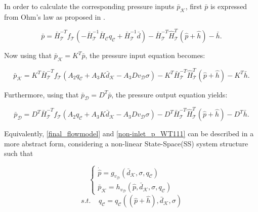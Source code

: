 In order to calculate the corresponding pressure inputs $\bar{p}_{\mathcal{K}}$, first $\bar{p}$ is expressed from Ohm's law as proposed in .

\begin{equation}
  \label{non-inlet_p_WT}
  \bar{p} =  \bar{H}^{-T}_{\mathcal{T}}f_{\mathcal{T}}(-\bar{H}^{-1}_{\mathcal{T}} \bar{H}_{\mathcal{C}} q_\mathcal{C} + \bar{H}^{-1}_{\mathcal{T}} \bar{d}) - \bar{H}^{-T}_{\mathcal{T}}\hat{H}^{T}_{\mathcal{T}} (\hat{p} + \hat{h}) - \bar{h} .
\end{equation}

Now using that $\bar{p}_{\mathcal{K}} = K^T \bar{p} $, the pressure input equation becomes:

\begin{equation}
  \label{non-inlet_p_WT1}
  \bar{p}_{\mathcal{K}} = K^T \bar{H}^{-T}_{\mathcal{T}}f_{\mathcal{T}}(A_2 q_\mathcal{C} + A_3 K \bar{d}_{\mathcal{K}} - A_3 D v_{\mathcal{D}} \sigma) - K^T\bar{H}^{-T}_{\mathcal{T}}\hat{H}^{T}_{\mathcal{T}} (\hat{p} + \hat{h}) - K^T\bar{h} .
\end{equation}

Furthermore, using that $\bar{p}_{\mathcal{D}} = D^T \bar{p} $, the pressure output equation yields:

\begin{equation}
  \label{non-inlet_p_WT111}
  \bar{p}_{\mathcal{D}} = D^T \bar{H}^{-T}_{\mathcal{T}}f_{\mathcal{T}}(A_2 q_\mathcal{C} + A_3 K \bar{d}_{\mathcal{K}} - A_3 D v_{\mathcal{D}} \sigma) - D^T\bar{H}^{-T}_{\mathcal{T}}\hat{H}^{T}_{\mathcal{T}} (\hat{p} + \hat{h}) - D^T\bar{h}.
\end{equation}

Equivalently, \eqref{final_flowmodel} and \eqref{non-inlet_p_WT111} can be described in a more abstract form, considering a non-linear State-Space(SS) system structure such that

\begin{equation}
\label{final_flowmodel_abstract}
\begin{cases}
    \dot{\hat{p}} = g_{v_{\mathcal{D}}}( \bar{d}_{\mathcal{K}}, \sigma, q_\mathcal{C})\\
    \bar{p}_{\mathcal{K}} =h_{v_{\mathcal{D}}}(\hat{p}, \bar{d}_{\mathcal{K}}, \sigma, q_\mathcal{C})
\end{cases}
\end{equation}
\begin{equation*}
s.t. \:\:\:\:\: q_\mathcal{C} = q_\mathcal{C}((\hat{p}+\hat{h}), \bar{d}_{\mathcal{K}}, \sigma)
\end{equation*}


